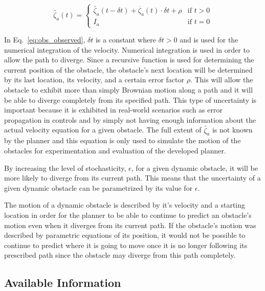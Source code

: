\begin{equation}
    \tilde{\zeta_a}(t) =
        \begin{cases}
            \tilde{\zeta_a}(t - \delta t) + \dot{\zeta_a}(t) \cdot \delta t
            + \rho
            & \text{if } t > 0 \\
            I_a & \text{if } t = 0
        \end{cases}
    \label{eq:obs_observed}
\end{equation}

In Eq.~\ref{eq:obs_observed}, $\delta t$ is a constant where $\delta t > 0$ and
is used for the numerical integration of the velocity. Numerical integration is
used in order to allow the path to diverge. Since a recursive function is used
for determining the current position of the obstacle, the obstacle's next
location will be determined by its last location, its velocity, and a certain
error factor $\rho$. This will allow the obstacle to exhibit more than simply
Brownian motion along a path and it will be able to diverge completely from its
specified path. This type of uncertainty is important because it is exhibited
in real-world scenarios such as error propagation in controls and by simply not
having enough information about the actual velocity equation for a given
obstacle. The full extent of $\tilde{\zeta_a}$ is not known by the planner and
this equation is only used to simulate the motion of the obstacles for
experimentation and evaluation of the developed planner.

By increasing the level of stochasticity, $\epsilon$, for a given dynamic
obstacle, it will be more likely to diverge from its current path. This means
that the uncertainty of a given dynamic obstacle can be parametrized by its
value for $\epsilon$.

The motion of a dynamic obstacle is described by it's velocity and a starting
location in order for the planner to be able to continue to predict an
obstacle's motion even when it diverges from its current path. If the
obstacle's motion was described by parametric equations of its position, it
would not be possible to continue to predict where it is going to move once it
is no longer following its prescribed path since the obstacle may diverge from
this path completely.

\subsection{Available Information}

